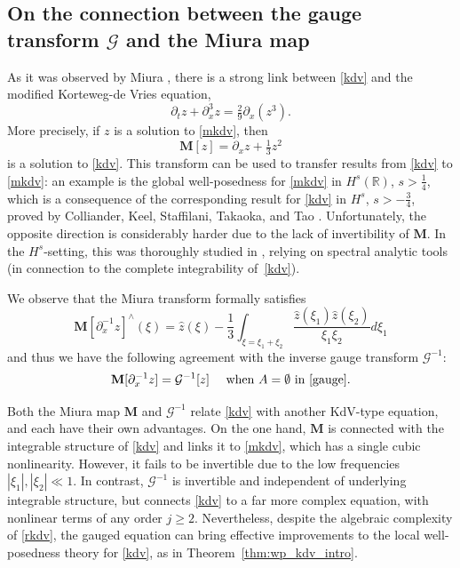 \documentclass[a4paper,
11pt,  reqno]{amsart}
\newcommand{\5}{\textup{V}}
\newcommand{\noi}{\noindent}
\newcommand{\dx}{\partial_x}
\theoremstyle{remark}
\newcommand{\R}{\mathbb{R}}
\newcommand{\MMb}{\mathbf{M}}
\newcommand{\Gc}{\mathcal{G}}
\numberwithin{equation}{section}
\numberwithin{theorem}{section}
\begin{document}
    \subsection{On the connection between the gauge transform $\Gc$ and the Miura map}
		As it was observed by Miura \cite{Miura}, there is a strong link between \eqref{kdv} and the modified Korteweg-de Vries equation,
		\begin{equation}
			\tag{mKdV}\label{mkdv}
			\partial_t z + \partial_x^3 z = \tfrac29 \partial_x(z^3).
		\end{equation}
		More precisely, if $z$ is a solution to \eqref{mkdv}, then
		\begin{equation}\label{eq:defiMiura}
			\MMb[z]=\partial_x z +\tfrac{1}{3}z^2
		\end{equation}
		is a solution to \eqref{kdv}. This transform can be used to transfer results from \eqref{kdv} to \eqref{mkdv}: an example is the global well-posedness for \eqref{mkdv} in $H^s(\R)$, $s>\frac14$, which is a consequence of the corresponding result for \eqref{kdv} in $H^s$, $s>-\frac34$, proved by Colliander, Keel, Staffilani, Takaoka, and Tao \cite{CKSTT_sharp_kdv}. Unfortunately, the opposite direction is considerably harder due to the lack of invertibility of $\MMb$. In the $H^s$-setting, this was thoroughly studied in  \cite{BuckmasterKoch, KPST_miura}, relying on spectral analytic tools (in connection to the complete integrability of~\eqref{kdv}).
		
		We observe that the Miura transform formally satisfies
		\begin{equation}\label{eq:miura2}
			{\MMb[\partial_x^{-1}z]}^\wedge(\xi) = \widehat{z}(\xi)-\frac{1}{3}\int_{\xi=\xi_1+\xi_2} \frac{\widehat{z}(\xi_1)\widehat{z}(\xi_2)}{\xi_1\xi_2}d\xi_1
		\end{equation}
        and thus we have the following agreement with the inverse gauge transform $\Gc^{-1}$:
        \begin{equation}
\MMb[\dx^{-1} z]=\Gc^{-1}[z]\quad \mbox{ when }A=\emptyset\mbox{ in }\eqref{gauge}.
        \end{equation}

{
\noi 
Both the Miura map $\MMb$ and $\Gc^{-1}$ relate \eqref{kdv} with another KdV-type equation, and each have their own advantages.
On the one hand, $\MMb$ is connected with the integrable structure of \eqref{kdv} and links it to \eqref{mkdv}, which has a single cubic nonlinearity. However, it fails to be invertible due to the low frequencies $|\xi_1|, |\xi_2|\ll 1$. 
In contrast, $\Gc^{-1}$ is invertible and independent of underlying integrable structure, but connects \eqref{kdv} to a far more complex equation, with nonlinear terms of any order $j\ge2$. Nevertheless, despite  the algebraic complexity of \eqref{rkdv}, the gauged equation can bring effective improvements to the local well-posedness theory for \eqref{kdv}, as in Theorem~\ref{thm:wp_kdv_intro}.

}
\end{document}
